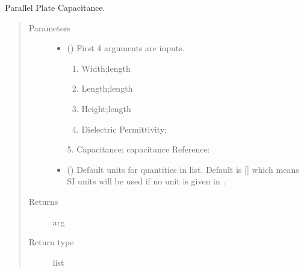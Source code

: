 \documentclass[letterpaper,10pt,english]{sphinxmanual}
\begin{document}

\begin{fulllineitems}
\label{\detokenize{components:components.ParallelPlateCap}}
Parallel Plate Capacitance.
\begin{quote}\begin{description}
\item[{Parameters}] \leavevmode\begin{itemize}
\item {} 
 () \textendash{} 
First 4 arguments are inputs.
\begin{enumerate}
%
\item {} 
Width;length

\item {} 
Length;length

\item {} 
Height;length

\item {} 
Dielectric Permittivity;

\end{enumerate}

5. Capacitance; capacitance
Reference:


\item {} 
 (\sphinxstyleliteralemphasis{\sphinxupquote{, }}) \textendash{} Default units for quantities in  list. Default is {[}{]} which means SI units will be used if no unit is given in .

\end{itemize}

\item[{Returns}] \leavevmode
arg

\item[{Return type}] \leavevmode
list

\end{description}\end{quote}

\end{fulllineitems}
\end{document}
